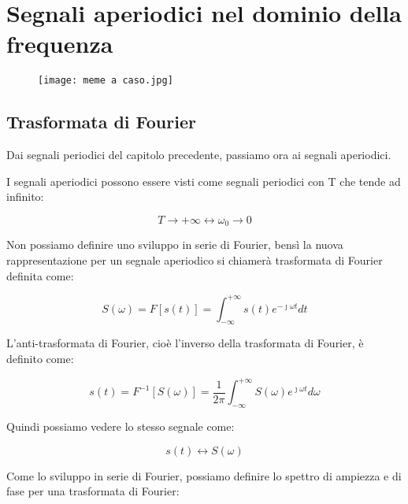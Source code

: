 \chapter{Segnali aperiodici nel dominio della frequenza}

\begin{figure}[h]
    \centering
    \texttt{[image: meme a caso.jpg]}
\end{figure}  

\newpage 

\section{Trasformata di Fourier}

Dai segnali periodici del capitolo precedente, passiamo ora ai segnali aperiodici. \newline 

I segnali aperiodici possono essere visti come segnali periodici con T che tende ad infinito:  

{
    \Large 
    \begin{equation}
        T \rightarrow + \infty 
        \leftrightarrow 
        \omega_0 \rightarrow 0
    \end{equation}
}

Non possiamo definire uno sviluppo in serie di Fourier, bensì la nuova rappresentazione 
per un segnale aperiodico si chiamerà trasformata di Fourier definita come: 

{
    \Large 
    \begin{equation}
        S(\omega) = F[s(t)] = \int_{-\infty}^{+\infty} s(t) e^{-\jmath \omega t} dt 
    \end{equation}
}

L'anti-trasformata di Fourier, cioè l'inverso della trasformata di Fourier, è definito come: 

{
    \Large 
    \begin{equation}
        s(t) = F^{-1} [S(\omega)] = \frac{1}{2 \pi} \int_{-\infty}^{+\infty} S(\omega) e^{\jmath \omega t} d\omega
    \end{equation}
}

Quindi possiamo vedere lo stesso segnale come: 

{
    \Large
    \begin{equation}
        s(t) 
        \leftrightarrow 
        S(\omega)
    \end{equation}
}

Come lo sviluppo in serie di Fourier, possiamo definire lo spettro di ampiezza e di fase 
per una trasformata di Fourier: 

